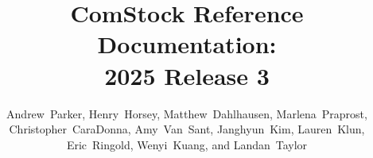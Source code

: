 \documentclass[]{nrel}
\title{ComStock Reference Documentation:\\[0.3em] 2025 Release 3}
\author{\mbox{Andrew Parker}, \mbox{Henry Horsey}, \mbox{Matthew Dahlhausen}, \mbox{Marlena Praprost}, \mbox{Christopher CaraDonna}, \mbox{Amy Van Sant}, \mbox{Janghyun Kim}, \mbox{Lauren Klun}, \mbox{Eric Ringold}, \mbox{Wenyi Kuang}, and \mbox{Landan Taylor}}
\affil{National Renewable Energy Laboratory}
\begin{document}
\frontmatter





\tableofcontents

\listoffigures

\listoftables

\mainmatter
{}



\label{chap:3_sampling}












\cleardoublepage
\label{sec:Bib}
\printbibliography[title={\LARGE References},heading=bibintoc]
\begin{appendices} %




\end{appendices}
\end{document}
